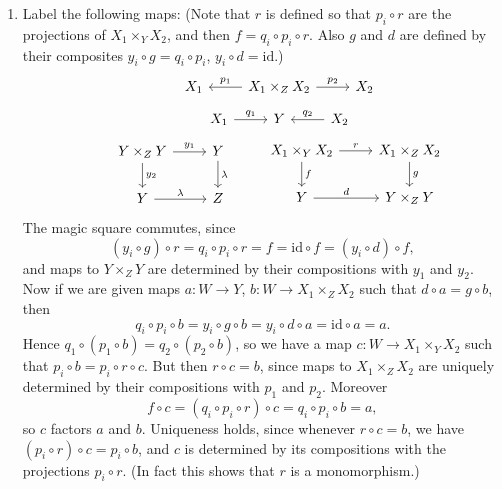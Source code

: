 \documentclass{report}
\newcommand{\id}{{\mathrm{id}}} %
\begin{document}
\begin{enumerate}[label=\textbf{1.3.\Alph*.}]
	\item Label the following maps: (Note that $r$ is defined so that
	      $p_i\circ r$ are the projections of $X_1\times_YX_2$, and then
	      $f=q_i\circ p_i\circ r$. Also $g$ and $d$ are defined by their
	      composites $y_i\circ g=q_i\circ p_i$, $y_i\circ d=\id$.)
	      \begin{equation*}
		      \begin{tikzcd}
			      &X_1 &\arrow{l}[swap]{p_1} X_1\times_ZX_2
			      \arrow{r}{p_2} &X_2
		      \end{tikzcd}
	      \end{equation*}
	      \begin{equation*}
		      \begin{tikzcd}
			      &X_1 \arrow{r}{q_1} &Y
			      &\arrow{l}[swap]{q_2} X_2
		      \end{tikzcd}
	      \end{equation*}
	      \begin{equation*}
		      \begin{tikzcd}
			      &Y\times_ZY \arrow{d}{y_2} \arrow{r}{y_1}
			      &Y \arrow{d}{\lambda} \\
			      &Y \arrow{r}{\lambda} &Z
		      \end{tikzcd}
		      \begin{tikzcd}
			      &X_1\times_YX_2 \arrow{d}{f} \arrow{r}{r}
			      &X_1\times_ZX_2 \arrow{d}{g} \\
			      &Y \arrow{r}{d} &Y\times_ZY
		      \end{tikzcd}
	      \end{equation*}
	      The magic square commutes, since
	      \begin{equation*}
		      (y_i\circ g)\circ r
		      = q_i\circ p_i\circ r
		      = f
		      = \id\circ f
		      = (y_i\circ d)\circ f,
	      \end{equation*}
	      and maps to $Y\times_ZY$ are determined by their compositions with
	      $y_1$ and $y_2$. Now if we are given maps $a:W\to Y$,
	      $b:W\to X_1\times_ZX_2$ such that $d\circ a=g\circ b$, then
	      \begin{equation*}
		      q_i\circ p_i\circ b
		      = y_i\circ g\circ b
		      = y_i\circ d\circ a
		      = \id\circ a
		      = a.
	      \end{equation*}
	      Hence $q_1\circ(p_1\circ b)=q_2\circ(p_2\circ b)$, so we have a map
	      $c:W\to X_1\times_YX_2$ such that $p_i\circ b=p_i\circ r\circ c$.
	      But then $r\circ c=b$, since maps to $X_1\times_ZX_2$ are uniquely
	      determined by their compositions with $p_1$ and $p_2$. Moreover
	      \begin{equation*}
		      f\circ c
		      = (q_i\circ p_i\circ r)\circ c
		      = q_i\circ p_i\circ b
		      = a,
	      \end{equation*}
	      so $c$ factors $a$ and $b$. Uniqueness holds, since whenever
	      $r\circ c=b$, we have $(p_i\circ r)\circ c=p_i\circ b$, and $c$ is
	      determined by its compositions with the projections $p_i\circ r$.
	      (In fact this shows that $r$ is a monomorphism.)


\end{enumerate}
\end{document}
